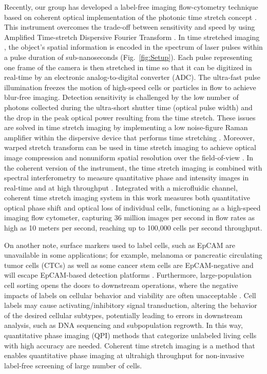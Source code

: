 \documentclass[aps,pra,reprint,superscriptaddress]{revtex4-1}
\begin{document}
Recently, our group has developed a label-free imaging flow-cytometry technique based on coherent optical implementation of the photonic time stretch concept \cite{mahjoubfar2013label}. This instrument overcomes the trade-off between sensitivity and speed by using Amplified Time-stretch Dispersive Fourier Transform \cite{goda2013dispersive, solli2009optical, goda2009theory, xing2015}. In time stretched imaging \cite{goda2009serial}, the object's spatial information is encoded in the spectrum of laser pulses within a pulse duration of sub-nanoseconds (Fig.~\ref{fig:Setup}). Each pulse representing one frame of the camera is then stretched in time so that it can be digitized in real-time by an electronic analog-to-digital converter (ADC). The ultra-fast pulse illumination freezes the motion of high-speed cells or particles in flow to achieve blur-free imaging. Detection sensitivity is challenged by the low number of photons collected during the ultra-short shutter time (optical pulse width) and the drop in the peak optical power resulting from the time stretch. These issues are solved in time stretch imaging by implementing a low noise-figure Raman amplifier within the dispersive device that performs time stretching \cite{goda2009serial,mahjoubfar2013label,mahjoubfar2013optically}. Moreover, warped stretch transform \cite{jalali2015tailoring,mahjoubfar2015design} can be used in time stretch imaging to achieve optical image compression and nonuniform spatial resolution over the field-of-view \cite{chen2015optical}. In the coherent version of the instrument, the time stretch imaging is combined with spectral interferometry to measure quantitative phase and intensity images in real-time and at high throughput \cite{mahjoubfar2014label}. Integrated with a microfluidic channel, coherent time stretch imaging system in this work measures both quantitative optical phase shift and optical loss of individual cells, functioning as a high-speed imaging flow cytometer, capturing 36 million images per second in flow rates as high as 10 meters per second, reaching up to 100,000 cells per second throughput.

On another note, surface markers used to label cells, such as EpCAM \cite{gires2009abundance} are unavailable in some applications; for example, melanoma or pancreatic circulating tumor cells (CTCs) as well as some cancer stem cells are EpCAM-negative and will escape EpCAM-based detection platforms \cite{kling2012beyond}. Furthermore, large-population cell sorting opens the doors to downstream operations, where the negative impacts of labels on cellular behavior and viability are often unacceptable \cite{boddington2011labeling}. Cell labels may cause activating/inhibitory signal transduction, altering the behavior of the desired cellular subtypes, potentially leading to errors in downstream analysis, such as DNA sequencing and subpopulation regrowth. In this way, quantitative phase imaging (QPI) methods \cite{ikeda2005hilbert,popescu2011quantitative,pham2013real, wei201528} that categorize unlabeled living cells with high accuracy are needed. Coherent time stretch imaging is a method that enables quantitative phase imaging at ultrahigh throughput for non-invasive label-free screening of large number of cells.
\end{document}
